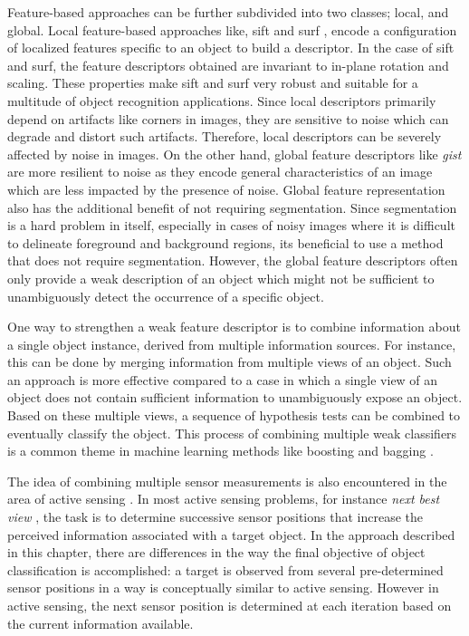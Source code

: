 \documentclass {udthesis}
\begin{document}
Feature-based approaches can be further subdivided into two classes; local, and global. Local feature-based approaches like, \gls{sift} \cite{sift} and \gls{surf} \cite{surf}, encode a configuration of localized features specific to an object to build a descriptor. In the case of \gls{sift} and \gls{surf}, the feature descriptors obtained are invariant to in-plane rotation and scaling. These properties make \gls{sift} and \gls{surf} very robust and suitable for a multitude of object recognition applications. Since local descriptors primarily depend on artifacts like corners in images, they are sensitive to noise which can degrade and distort such artifacts. Therefore, local descriptors can be severely affected by noise in images. On the other hand, global feature descriptors like \textit{gist} \cite{gist} are more resilient to noise as they encode general characteristics of an image which are less impacted by the presence of noise. Global feature representation also has the additional benefit of not 
requiring segmentation. Since segmentation is a hard problem in itself, especially in
cases of noisy images where it is difficult to delineate foreground and background regions, its beneficial to use a method that does not require segmentation. However, the global feature descriptors often only provide a weak description of an object which might not be sufficient to unambiguously detect the occurrence of a specific object.

One way to strengthen a weak feature descriptor is to combine information about a single object instance, derived from multiple information sources. For instance, this can be done by merging information from multiple views of an object. Such an approach is more effective compared to a case in which a single view of an object does not contain sufficient information to unambiguously expose an object. Based on these multiple views, a sequence of hypothesis tests can be combined to eventually classify the object. This process of combining multiple weak classifiers is a common theme in machine learning methods like boosting and bagging \cite{alpaydin}.

The idea of combining multiple sensor measurements is also encountered in the area of active sensing \cite{chen}. In most active sensing problems, for instance \emph{next best view} \cite{roy,dunn}, the task is to determine successive sensor positions that increase the perceived information  associated with a target object. In the approach described in this chapter, there are differences in the way the final objective of object classification is accomplished: a target is observed from several pre-determined sensor positions in a way is conceptually similar to active sensing. However in active sensing, the next sensor position is determined at each iteration based on the current information available.
\end{document}
